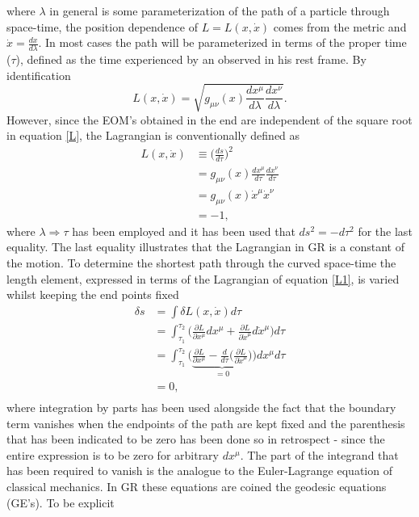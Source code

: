 where $\lambda$ in general is some parameterization of the path of a particle through space-time, the position dependence of $L=L(x,\dot{x})$ comes from the metric and $\dot{x}=\frac{dx}{d\lambda}$. In most cases the path will be parameterized in terms of the proper time ($\tau$), defined as the time experienced by an observed in his rest frame. By identification
\begin{equation}
	L(x,\dot{x})=\sqrt{g_{\mu\nu}(x)\frac{dx^\mu}{d\lambda} \frac{dx^\nu}{d\lambda}}.
	\label{L}
\end{equation} 
However, since the EOM's obtained in the end are independent of the square root in equation \eqref{L}, the Lagrangian is conventionally defined as~\citep{Cheng}
\begin{equation}
	\begin{split}
		L(x,\dot{x})&\equiv\bigg(\frac{ds}{d\tau}\bigg)^2\\
		&=g_{\mu\nu}(x)\frac{dx^\mu}{d\tau} \frac{dx^\nu}{d\tau}\\
		&=g_{\mu\nu}(x)\dot{x}^\mu \dot{x}^\nu\\
		&=-1,
	\end{split}
	\label{L1}
\end{equation} 
where $\lambda\Rightarrow \tau$ has been employed and it has been used that $ds^2=-d\tau^2$ for the last equality. The last equality illustrates that the Lagrangian in GR is a constant of the motion. To determine the shortest path through the curved space-time the length element, expressed in terms of the Lagrangian of equation \eqref{L1}, is varied whilst keeping the end points fixed
\begin{equation}
	\begin{split}
		\delta s&=\int \delta L(x,\dot{x})d\tau\\
		&=\int_{\tau_1}^{\tau_2}\bigg(\frac{\partial L}{\partial x^\mu}dx^\mu+\frac{\partial L}{\partial \dot{x}^\mu}d\dot{x}^\mu\bigg)d\tau\\
		&=\int_{\tau_1}^{\tau_2}\bigg(\underbrace{\frac{\partial L}{\partial x^\mu}-\frac{d}{d\tau}\bigg(\frac{\partial L}{\partial \dot{x}^\mu}\bigg)}_{=0}\bigg)dx^\mu d\tau\\
		&=0,\\
	\end{split}
\end{equation} 
where integration by parts has been used alongside the fact that the boundary term vanishes when the endpoints of the path are kept fixed and the parenthesis that has been indicated to be zero has been done so in retrospect - since the entire expression is to be zero for arbitrary $dx^\mu$. The part of the integrand that has been required to vanish is the analogue to the Euler-Lagrange equation of classical mechanics. In GR these equations are coined the geodesic equations (GE's). To be explicit
